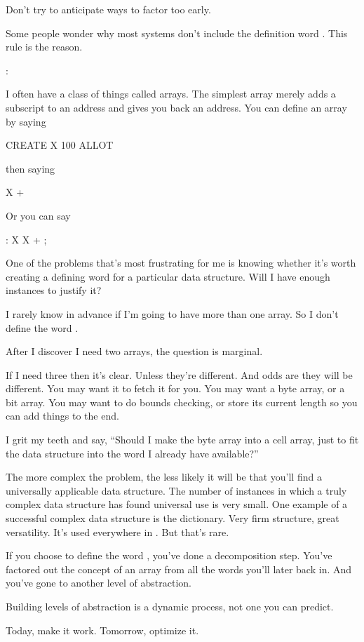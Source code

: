 \begin{tip}
Don't try to anticipate ways to factor too early.
\end{tip}%
Some people wonder why most \Forth{} systems don't include the
definition word . This rule is the reason.
\begin{interview}
:
\begin{tfquot}
I often have a class of things called arrays. The simplest array
merely adds a subscript to an address and gives you back an
address. You can define an array by saying
\begin{Code}
CREATE X   100 ALLOT
\end{Code}
then saying
\begin{Code}
X +
\end{Code}
Or you can say
\begin{Code}
: X   X + ;
\end{Code}
One of the problems that's most frustrating for me is knowing whether
it's worth creating a defining word for a particular data structure.
Will I have enough instances to justify it?

I rarely know in advance if I'm going to have more than one array. So
I don't define the word .

After I discover I need two arrays, the question is marginal.

If I need three then it's clear. Unless they're different. And odds
are they will be different. You may want it to fetch it for you. You
may want a byte array, or a bit array. You may want to do bounds
checking, or store its current length so you can add things to the
end.

I grit my teeth and say, ``Should I make the byte array into a cell
array, just to fit the data structure into the word I already have
available?''

The more complex the problem, the less likely it will be that you'll
find a universally applicable data structure. The number of instances
in which a truly complex data structure has found universal use is
very small. One example of a successful complex data structure is the
\Forth{} dictionary. Very firm structure, great versatility. It's used
everywhere in \Forth{}. But that's rare.

If you choose to define the word , you've done a
decomposition step. You've factored out the concept of an array from
all the words you'll later back in. And you've gone to another level
of abstraction.

Building levels of abstraction is a dynamic process, not one you can
predict.
\end{tfquot}
\end{interview}%
\begin{tip}
Today, make it work. Tomorrow, optimize it.
\end{tip}

